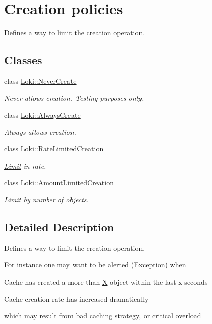 \hypertarget{group__CreationPolicyCachedFactoryGroup}{}\section{Creation policies}
\label{group__CreationPolicyCachedFactoryGroup}


Defines a way to limit the creation operation.  


\subsection*{Classes}
\begin{DoxyCompactItemize}
\item 
class \hyperlink{classLoki_1_1NeverCreate}{Loki\+::\+Never\+Create}
\begin{DoxyCompactList}\small\item\em Never allows creation. Testing purposes only. \end{DoxyCompactList}\item 
class \hyperlink{classLoki_1_1AlwaysCreate}{Loki\+::\+Always\+Create}
\begin{DoxyCompactList}\small\item\em Always allows creation. \end{DoxyCompactList}\item 
class \hyperlink{classLoki_1_1RateLimitedCreation}{Loki\+::\+Rate\+Limited\+Creation}
\begin{DoxyCompactList}\small\item\em \hyperlink{classLimit}{Limit} in rate. \end{DoxyCompactList}\item 
class \hyperlink{classLoki_1_1AmountLimitedCreation}{Loki\+::\+Amount\+Limited\+Creation}
\begin{DoxyCompactList}\small\item\em \hyperlink{classLimit}{Limit} by number of objects. \end{DoxyCompactList}\end{DoxyCompactItemize}


\subsection{Detailed Description}
Defines a way to limit the creation operation. 

For instance one may want to be alerted (Exception) when
\begin{DoxyItemize}
\item Cache has created a more than \hyperlink{structX}{X} object within the last x seconds
\item Cache creation rate has increased dramatically
\end{DoxyItemize}which may result from bad caching strategy, or critical overload 